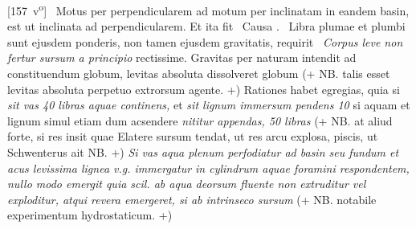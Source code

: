 [157~v\textsuperscript{o}]
\pend%
\pstart%
%
%
%
% 
 \, Motus per perpendicularem ad motum per inclinatam\protect{} in eandem basin, est ut inclinata ad perpendicularem. Et ita fit 
\pend 
\pstart
{} \, Causa  .
\pend 
\pstart
{} \, Libra plumae et plumbi sunt ejusdem ponderis, non tamen ejusdem gravitatis, requirit  
\pend
\pstart
{} \,
\textit{Corpus leve non fertur sursum a principio } rectissime. Gravitas per naturam intendit ad constituendum globum, levitas absoluta\protect{} dissolveret globum (+ NB. talis esset levitas absoluta
 perpetuo extrorsum agente. +) Rationes habet egregias, quia si \textit{sit vas 40 libras aquae continens,} et \textit{sit lignum immersum pendens 10 } si aquam et lignum simul etiam dum acsendere \textit{nititur appendas, 50 libras } (+ NB. at aliud forte, si res insit quae Elatere sursum tendat, ut res arcu explosa, piscis, ut Schwenterus\protect{} ait NB. +) \textit{Si vas aqua plenum perfodiatur ad basin seu fundum et acus levissima lignea v.g. immergatur in cylindrum aquae foramini respondentem, nullo modo emergit quia scil. ab aqua deorsum fluente non extruditur vel exploditur, atqui revera emergeret, si ab intrinseco sursum } (+ NB. notabile experimentum hydrostaticum\protect{}. +)
